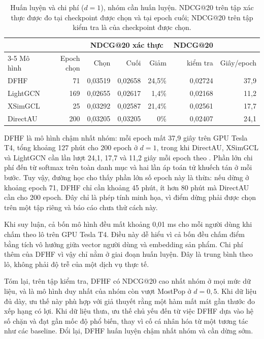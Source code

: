 \begin{table}[H]
\centering
\small
\begin{tabular}{@{}lrrrrrr@{}}
\toprule
& & \multicolumn{3}{c}{NDCG@20 xác thực} & NDCG@20 & \\
\cmidrule(lr){3-5}
Mô hình & Epoch chọn & Chọn & Cuối & Giảm & kiểm tra & Giây/epoch \\
\midrule
DFHF & 71 & 0,03519 & 0,02658 & 24,5\% & 0,02724 & 37,9 \\
LightGCN & 169 & 0,02655 & 0,02617 & 1,4\% & 0,02168 & 11,2 \\
XSimGCL & 25 & 0,03292 & 0,02587 & 21,4\% & 0,02561 & 17,7 \\
DirectAU & 200 & 0,03205 & 0,03205 & 0\% & 0,02407 & 24,1 \\
\bottomrule
\end{tabular}
\caption[Huấn luyện và chi phí ($d=1$), nhóm cần huấn luyện]{Huấn luyện và chi phí ($d=1$), nhóm cần huấn luyện. NDCG@20 trên tập xác thực được đo tại checkpoint được chọn và tại epoch cuối; NDCG@20 trên tập kiểm tra là của checkpoint được chọn.}
\label{tab:training}
\end{table}

DFHF là mô hình chậm nhất nhóm: mỗi epoch mất 37,9 giây trên GPU Tesla T4, tổng khoảng 127 phút cho 200 epoch ở $d=1$, trong khi DirectAU, XSimGCL và LightGCN cần lần lượt 24,1, 17,7 và 11,2 giây mỗi epoch theo . Phần lớn chi phí đến từ softmax trên toàn danh mục và hai lần áp toán tử khuếch tán ở mỗi bước. Tuy vậy, đường học cho thấy phần lớn số epoch này là thừa: nếu dừng ở khoảng epoch 71, DFHF chỉ cần khoảng 45 phút, ít hơn 80 phút mà DirectAU cần cho 200 epoch. Đây chỉ là phép tính minh họa, vì điểm dừng phải được chọn trên một tập riêng và báo cáo chưa thử cách này.

Khi suy luận, cả bốn mô hình đều mất khoảng 0,01 ms cho mỗi người dùng khi chấm theo lô trên GPU Tesla T4. Điều này dễ hiểu vì cả bốn đều chấm điểm bằng tích vô hướng giữa vector người dùng và embedding sản phẩm. Chi phí thêm của DFHF vì vậy chỉ nằm ở giai đoạn huấn luyện. Đây là trung bình theo lô, không phải độ trễ của một dịch vụ thực tế.

Tóm lại, trên tập kiểm tra, DFHF có NDCG@20 cao nhất nhóm ở mọi mức dữ liệu, và là mô hình duy nhất của nhóm còn vượt MostPop ở $d=0{,}5$. Khi dữ liệu đủ dày, ưu thế này phù hợp với giả thuyết rằng một hàm mất mát gần thước đo xếp hạng có lợi. Khi dữ liệu thưa, ưu thế chủ yếu đến từ việc DFHF dựa vào hệ số chặn và đạt gần mốc độ phổ biến, thay vì cố cá nhân hóa từ một tương tác như các baseline. Đổi lại, DFHF huấn luyện chậm nhất nhóm và cần dừng sớm.

